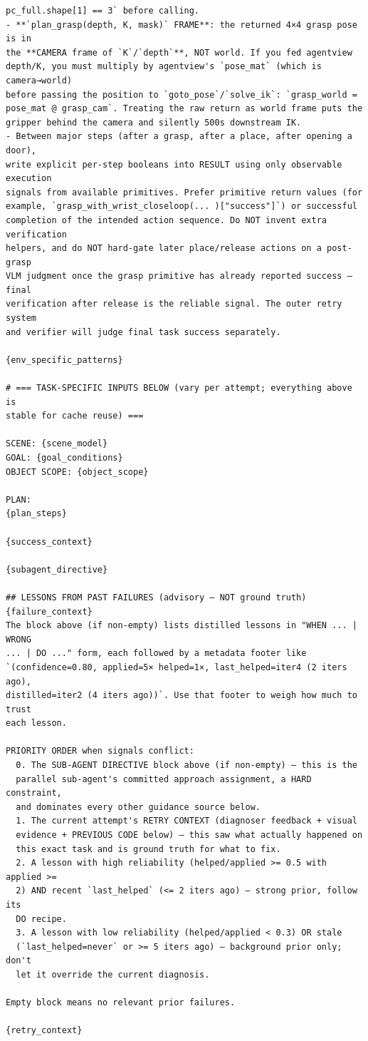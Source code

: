 \documentclass{llmxive}
\begin{document}
\begin{lstlisting}[style=ratsappendixprompt]
pc_full.shape[1] == 3` before calling.
- **`plan_grasp(depth, K, mask)` FRAME**: the returned 4×4 grasp pose is in
the **CAMERA frame of `K`/`depth`**, NOT world. If you fed agentview
depth/K, you must multiply by agentview's `pose_mat` (which is camera→world)
before passing the position to `goto_pose`/`solve_ik`: `grasp_world =
pose_mat @ grasp_cam`. Treating the raw return as world frame puts the
gripper behind the camera and silently 500s downstream IK.
- Between major steps (after a grasp, after a place, after opening a door),
write explicit per-step booleans into RESULT using only observable execution
signals from available primitives. Prefer primitive return values (for
example, `grasp_with_wrist_closeloop(... )["success"]`) or successful
completion of the intended action sequence. Do NOT invent extra verification
helpers, and do NOT hard-gate later place/release actions on a post-grasp
VLM judgment once the grasp primitive has already reported success — final
verification after release is the reliable signal. The outer retry system
and verifier will judge final task success separately.

{env_specific_patterns}

# === TASK-SPECIFIC INPUTS BELOW (vary per attempt; everything above is
stable for cache reuse) ===

SCENE: {scene_model}
GOAL: {goal_conditions}
OBJECT SCOPE: {object_scope}

PLAN:
{plan_steps}

{success_context}

{subagent_directive}

## LESSONS FROM PAST FAILURES (advisory — NOT ground truth)
{failure_context}
The block above (if non-empty) lists distilled lessons in "WHEN ... | WRONG
... | DO ..." form, each followed by a metadata footer like
`(confidence=0.80, applied=5× helped=1×, last_helped=iter4 (2 iters ago),
distilled=iter2 (4 iters ago))`. Use that footer to weigh how much to trust
each lesson.

PRIORITY ORDER when signals conflict:
  0. The SUB-AGENT DIRECTIVE block above (if non-empty) — this is the
  parallel sub-agent's committed approach assignment, a HARD constraint,
  and dominates every other guidance source below.
  1. The current attempt's RETRY CONTEXT (diagnoser feedback + visual
  evidence + PREVIOUS CODE below) — this saw what actually happened on
  this exact task and is ground truth for what to fix.
  2. A lesson with high reliability (helped/applied >= 0.5 with applied >=
  2) AND recent `last_helped` (<= 2 iters ago) — strong prior, follow its
  DO recipe.
  3. A lesson with low reliability (helped/applied < 0.3) OR stale
  (`last_helped=never` or >= 5 iters ago) — background prior only; don't
  let it override the current diagnosis.

Empty block means no relevant prior failures.

{retry_context}

\end{lstlisting}
\end{document}
